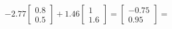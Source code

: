 \documentclass[preview]{standalone}
\begin{document}
\begin{align*}
-2.77 \begin{bmatrix} 0.8 \\ 0.5 \end{bmatrix} + 1.46 \begin{bmatrix} 1 \\ 1.6 \end{bmatrix} = \begin{bmatrix} -0.75 \\ 0.95 \end{bmatrix} =
\end{align*}
\end{document}
